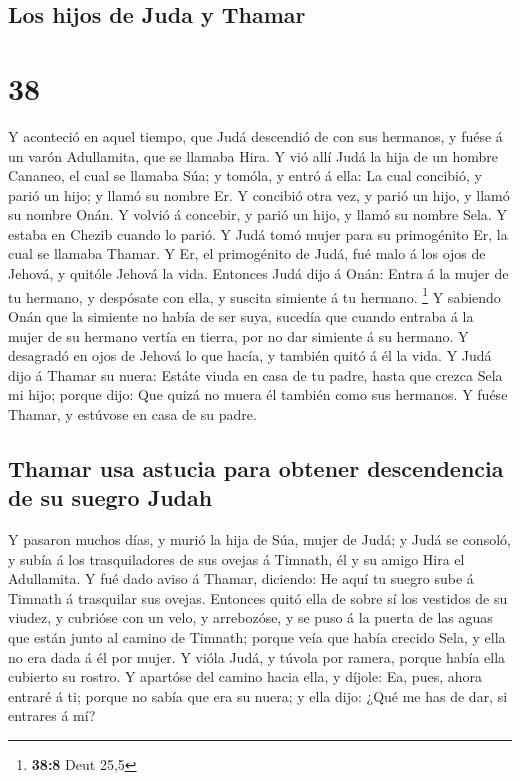 \hypertarget{los-hijos-de-juda-y-thamar}{%
\subsection{Los hijos de Juda y
Thamar}\label{los-hijos-de-juda-y-thamar}}

\hypertarget{section-37}{%
\section{38}\label{section-37}}

 Y aconteció en aquel tiempo, que Judá descendió de con
sus hermanos, y fuése á un varón Adullamita, que se llamaba Hira.
 Y vió allí Judá la hija de un hombre Cananeo, el cual se
llamaba Súa; y tomóla, y entró á ella:  La cual concibió,
y parió un hijo; y llamó su nombre Er.  Y concibió otra
vez, y parió un hijo, y llamó su nombre Onán.  Y volvió á
concebir, y parió un hijo, y llamó su nombre Sela. Y estaba en Chezib
cuando lo parió.  Y Judá tomó mujer para su primogénito
Er, la cual se llamaba Thamar.  Y Er, el primogénito de
Judá, fué malo á los ojos de Jehová, y quitóle Jehová la vida.
 Entonces Judá dijo á Onán: Entra á la mujer de tu
hermano, y despósate con ella, y suscita simiente á tu hermano.
\footnote{\textbf{38:8} Deut 25,5}  Y sabiendo Onán que la
simiente no había de ser suya, sucedía que cuando entraba á la mujer de
su hermano vertía en tierra, por no dar simiente á su hermano.
 Y desagradó en ojos de Jehová lo que hacía, y también
quitó á él la vida.  Y Judá dijo á Thamar su nuera:
Estáte viuda en casa de tu padre, hasta que crezca Sela mi hijo; porque
dijo: Que quizá no muera él también como sus hermanos. Y fuése Thamar, y
estúvose en casa de su padre.

\hypertarget{thamar-usa-astucia-para-obtener-descendencia-de-su-suegro-judah}{%
\subsection{Thamar usa astucia para obtener descendencia de su suegro
Judah}\label{thamar-usa-astucia-para-obtener-descendencia-de-su-suegro-judah}}

 Y pasaron muchos días, y murió la hija de Súa, mujer de
Judá; y Judá se consoló, y subía á los trasquiladores de sus ovejas á
Timnath, él y su amigo Hira el Adullamita.  Y fué dado
aviso á Thamar, diciendo: He aquí tu suegro sube á Timnath á trasquilar
sus ovejas.  Entonces quitó ella de sobre sí los vestidos
de su viudez, y cubrióse con un velo, y arrebozóse, y se puso á la
puerta de las aguas que están junto al camino de Timnath; porque veía
que había crecido Sela, y ella no era dada á él por mujer.
 Y vióla Judá, y túvola por ramera, porque había ella
cubierto su rostro.  Y apartóse del camino hacia ella, y
díjole: Ea, pues, ahora entraré á ti; porque no sabía que era su nuera;
y ella dijo: ¿Qué me has de dar, si entrares á mí?

